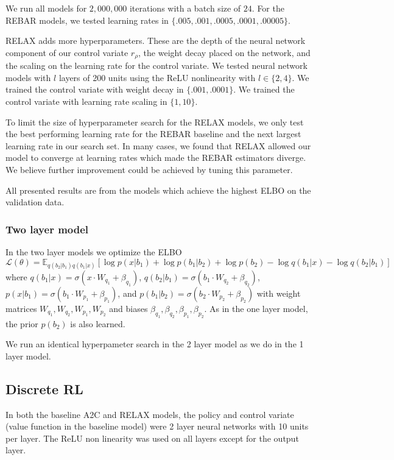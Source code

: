 \documentclass{article}
\newcommand{\E}{\mathbb{E}}
\newcommand{\RELAX}{{\textnormal{RELAX}}}
\begin{document}
We run all models for $2,000,000$ iterations with a batch size of $24$.
For the REBAR models, we tested learning rates in $\{.005, .001, .0005,  .0001, .00005\}$. 

\RELAX{} adds more hyperparameters.
These are the depth of the neural network component of our control variate $r_\rho$, the weight decay placed on the network, and the scaling on the learning rate for the control variate.
We tested neural network models with $l$ layers of 200 units using the ReLU nonlinearity with $l \in \{2, 4\}$.
We trained the control variate with weight decay in $\{.001, .0001\}$.
We trained the control variate with learning rate scaling in $\{1, 10\}$.

To limit the size of hyperparameter search for the RELAX models, we only test the best performing learning rate for the REBAR baseline and the next largest learning rate in our search set.
In many cases, we found that RELAX allowed our model to converge at learning rates which made the REBAR estimators diverge.
We believe further improvement could be achieved by tuning this parameter.

All presented results are from the models which achieve the highest ELBO on the validation data.

\subsubsection{Two layer model}
In the two layer models we optimize the ELBO $$\mathcal{L}(\theta) = \E_{q(b_2|b_1)q(b_1|x)}[\log p(x|b_1) + \log p(b_1|b_2) + \log p(b_2) - \log q(b_1|x) - \log q(b_2|b_1)]$$ where $q(b_1|x) = \sigma(x\cdot W_{q_1} + \beta_{q_1})$, $q(b_2|b_1) = \sigma(b_1\cdot W_{q_2} + \beta_{q_2})$, $p(x| b_1) = \sigma(b_1\cdot W_{p_1} + \beta_{p_1})$, and $p(b_1| b_2) = \sigma(b_2\cdot W_{p_2} + \beta_{p_2})$ with weight matrices $W_{q_1},W_{q_2},W_{p_1},W_{p_2}$ and biases $\beta_{q_1},\beta_{q_2},\beta_{p_1},\beta_{p_2}$. As in the one layer model, the prior $p(b_2)$ is also learned.

We run an identical hyperpameter search in the 2 layer model as we do in the 1 layer model. 


\subsection{Discrete RL}
In both the baseline A2C and RELAX models, the policy and control variate (value function in the baseline model) were 2 layer neural networks with 10 units per layer.
The ReLU non linearity was used on all layers except for the output layer.
\end{document}
